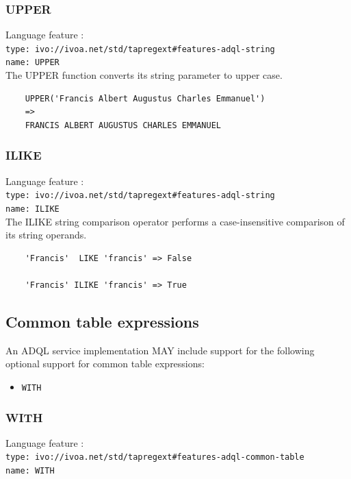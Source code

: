 \documentclass[11pt,a4paper]{ivoa}
\begin{document}
\subsubsection{UPPER}
\label{sec:string.functions.upper}
{\footnotesize Language feature :}\\
{\footnotesize \verb|type: ivo://ivoa.net/std/tapregext#features-adql-string|}\\
{\footnotesize \verb|name: UPPER|}\\

The UPPER function converts its string parameter to upper case.

\begin{verbatim}
    UPPER('Francis Albert Augustus Charles Emmanuel')
    =>
    FRANCIS ALBERT AUGUSTUS CHARLES EMMANUEL
\end{verbatim}

\subsubsection{ILIKE}
\label{sec:string.functions.ilike}
{\footnotesize Language feature :}\\
{\footnotesize \verb|type: ivo://ivoa.net/std/tapregext#features-adql-string|}\\
{\footnotesize \verb|name: ILIKE|}\\

The ILIKE string comparison operator performs a case-insensitive comparison
of its string operands.

\begin{verbatim}
    'Francis'  LIKE 'francis' => False

    'Francis' ILIKE 'francis' => True
\end{verbatim}

\subsection{Common table expressions}
\label{sec:common-table}

An ADQL service implementation MAY include support for the following optional
support for common table expressions:

\begin{itemize}
    \item \verb:WITH:
\end{itemize}

\subsubsection{WITH}
{\footnotesize Language feature :}\\
{\footnotesize \verb|type: ivo://ivoa.net/std/tapregext#features-adql-common-table|}\\
{\footnotesize \verb|name: WITH|}\\
\end{document}
